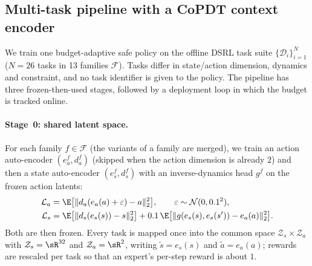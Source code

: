 %

\providecommand{\Zsp}{\mathcal{Z}}
\providecommand{\ind}{\mathbf{1}}
\providecommand{\QC}{Q_C}
\providecommand{\VC}{V_C}
\providecommand{\bud}{\delta}
\providecommand{\ctx}{\zeta}
\providecommand{\epsd}{e_s}      %
\providecommand{\epsa}{e_a}      %
\providecommand{\decs}{d_s}      %
\providecommand{\deca}{d_a}      %
\providecommand{\penc}{p_e}      %
\providecommand{\Dtask}{\mathcal{D}_i}
\providecommand{\Ctx}{\mathcal{X}}   %
\providecommand{\Fam}{\mathcal{F}}   %

\subsection{Multi-task pipeline with a CoPDT context encoder}
\label{sec:copdt-pipeline}

We train one budget-adaptive safe policy on the offline DSRL task suite
$\{\Dtask\}_{i=1}^{N}$ ($N=26$ tasks in 13 families $\Fam$).  Tasks differ in
state/action dimension, dynamics and constraint, and no task identifier is
given to the policy.  The pipeline has three frozen-then-used stages, followed by
a deployment loop in which the budget is tracked online.

\paragraph{Stage~0: shared latent space.}
For each family $f\in\Fam$ (the variants of a family are merged), we train an
action auto-encoder $(\epsa^f,\deca^f)$ (skipped when the action dimension is
already $2$) and then a state auto-encoder $(\epsd^f,\decs^f)$ with an
inverse-dynamics head $g^f$ on the frozen action latents:
\begin{align}
  \mathcal{L}_a &= \E\big[\|\deca(\epsa(a)+\varepsilon)-a\|_2^2\big],
  \qquad \varepsilon\sim\mathcal{N}(0,0.1^2),\\
  \mathcal{L}_s &= \E\big[\|\decs(\epsd(s))-s\|_2^2\big]
  + 0.1\,\E\big[\|g(\epsd(s),\epsd(s'))-\epsa(a)\|_2^2\big].
\end{align}
Both are then frozen.  Every task is mapped once into the common space
$\Zsp_s\times\Zsp_a$ with $\Zsp_s=\sR^{32}$ and $\Zsp_a=\sR^{2}$, writing
$\tilde s=\epsd(s)$ and $\tilde a=\epsa(a)$; rewards are rescaled per task so that
an expert's per-step reward is about $1$.

